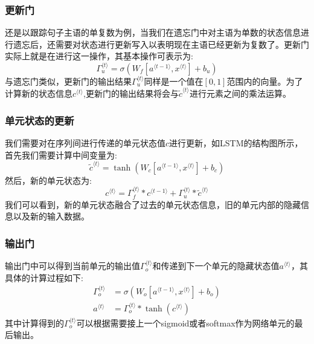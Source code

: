 \documentclass{ctexart}
\begin{document}
\subsubsection{更新门}
还是以跟踪句子主语的单复数为例，当我们在遗忘门中对主语为单数的状态信息进行遗忘后，还需要对状态进行更新写入以表明现在主语已经更新为复数了。更新门实际上就是在进行这一操作，其基本操作可表示为:
\begin{equation*}
\Gamma_u^{\langle t \rangle} = \sigma(W_f[a^{\langle t-1 \rangle}, x^{\langle t \rangle}] + b_u)
\end{equation*}
与遗忘门类似，更新门的输出结果$\Gamma_u^{\langle t \rangle}$同样是一个值在$[0,1]$范围内的向量。为了计算新的状态信息$c^{\langle t \rangle}$,更新门的输出结果将会与$\tilde{c}^{\langle t \rangle}$进行元素之间的乘法运算。
\subsubsection{单元状态的更新}
我们需要对在序列间进行传递的单元状态值$c$进行更新，如LSTM的结构图所示，首先我们需要计算中间变量为:
\begin{equation*}
\tilde{c}^{\langle t \rangle} = \tanh(W_c[a^{\langle t-1 \rangle}, x^{\langle t \rangle}] + b_c)
\end{equation*}
然后，新的单元状态为:
\begin{equation*}
c^{\langle t \rangle} = \Gamma_f^{\langle t \rangle}* c^{\langle t-1 \rangle} + \Gamma_u^{\langle t \rangle} *\tilde{c}^{\langle t \rangle}
\end{equation*}
我们可以看到，新的单元状态融合了过去的单元状态信息，旧的单元内部的隐藏信息以及新的输入数据。
\subsubsection{输出门}
输出门中可以得到当前单元的输出值$\Gamma_o^{\langle t \rangle}$和传递到下一个单元的隐藏状态值$a^{\langle t \rangle}$，其具体的计算过程如下:
\begin{align*}
\Gamma_o^{\langle t \rangle}&=  \sigma(W_o[a^{\langle t-1 \rangle}, x^{\langle t \rangle}] + b_o)\\
a^{\langle t \rangle} &= \Gamma_o^{\langle t \rangle}* \tanh(c^{\langle t \rangle})
\end{align*}
其中计算得到的$\Gamma_o^{\langle t \rangle}$可以根据需要接上一个sigmoid或者softmax作为网络单元的最后输出。
\end{document}
